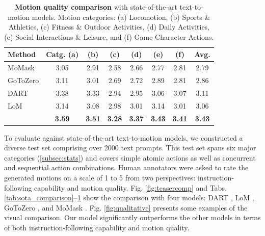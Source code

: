 \begin{table}[tb]
    \centering
    \caption{\textbf{Motion quality comparison} with state-of-the-art text-to-motion models. Motion categories: (a) Locomotion, (b) Sports \& Athletics, (c) Fitness \& Outdoor Activities, (d) Daily Activities, (e) Social Interactions \& Leisure, and (f) Game Character Actions.}
    \vspace{5pt}
    \label{tab:sota_comparison_mq}
    \begin{tabular}{l|cccccc|c}
        \toprule
        Method & Catg. (a) & (b) & (c) & (d) & (e) & (f) & Avg.  \\
        \midrule
        MoMask \cite{momask} & 3.05 & 2.91 & 2.58 & 2.66 & 2.77 & 2.81 & 2.79 \\
        GoToZero \cite{Fan_2025_ICCV} & 3.11 & 3.01 & 2.69 & 2.72 & 2.89 & 2.81 & 2.86  \\
        DART \cite{DartControl} & 3.38 & 3.33 & 2.94 & 2.95 & 3.06 & 3.07 & 3.11  \\
        LoM \cite{chen2024language} & 3.14 & 3.08 & 2.98 & 3.01 & 3.14 & 3.01 & 3.06  \\
        \midrule
        \textbf{\modelname{}} & \textbf{3.59} & \textbf{3.51} & \textbf{3.28} & \textbf{3.37} & \textbf{3.43} & \textbf{3.41} & \textbf{3.43} \\
        \bottomrule
    \end{tabular}
\end{table}


To evaluate \modelname{} against state-of-the-art text-to-motion models, we constructed a diverse test set comprising over 2000 text prompts. This test set spans six major categories (\cref{subsec:stats}) and covers simple atomic actions as well as concurrent and sequential action combinations. Human annotators were asked to rate the generated motions on a scale of 1 to 5 from two perspectives: instruction-following capability and motion quality. Fig. \ref{fig:teasercomp} and Tabs. \ref{tab:sota_comparison}–\ref{tab:sota_comparison_mq} show the comparison with four models: DART \cite{DartControl}, LoM \cite{chen2024language}, GoToZero \cite{Fan_2025_ICCV}, and MoMask \cite{momask}. Fig. \cref{fig:qualitative} presents some examples of the visual comparison. Our model significantly outperforms the other models in terms of both instruction-following capability and motion quality.

